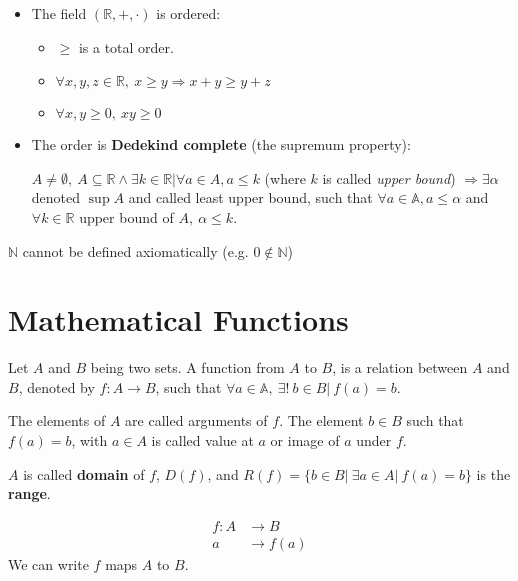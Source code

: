 \documentclass[12pt, a4paper]{book}
\begin{document}
\begin{defn}
\begin{itemize}
    \item The field $(\mathbb{R},+,\cdot)$ is ordered:
    \begin{itemize}
      \item $\geq$ is a total order.
      \item $\forall x,y,z\in\mathbb{R}, \ x\geq y \Rightarrow x+y \geq y+z$
      \item $\forall x,y \geq 0, \ xy\geq 0$
    \end{itemize}

    \item The order is \textbf{Dedekind complete} (the supremum property):
    
    $A \neq \emptyset, \ A \subseteq \mathbb{R} \wedge \exists k\in\mathbb{R} \vert \forall a\in A, a\leq k$ (where $k$ is called \textit{upper bound}) $\Rightarrow \exists \alpha$ denoted $\sup A$ and called least upper bound, such that $\forall a\in\mathbb{A}, a\leq\alpha$ and $\forall k\in\mathbb{R}$ upper bound of $A,\ \alpha \leq k$.
  \end{itemize}
\end{defn}

\begin{rem}
  $\mathbb{N}$ cannot be defined axiomatically (e.g. $0\notin\mathbb{N}$)
\end{rem}


\section{Mathematical Functions}

\begin{defn}
  Let $A$ and $B$ being two sets. A function from $A$ to $B$, is a relation between $A$ and $B$, denoted by $f:A\rightarrow B$, such that $\forall a\in\mathbb{A}, \ \exists!\ b\in B \vert \ f(a) = b$.

  The elements of $A$ are called arguments of $f$. The element $b\in B$ such that $f(a) = b$, with $a \in A$ is called value at $a$ or image of $a$ under $f$.

  $A$ is called \textbf{domain} of $f$, $D(f)$, and $R(f) = \{b\in B\vert\ \exists a\in A \vert\ f(a)=b\}$ is the \textbf{range}.
\end{defn}

\begin{notation}
  \begin{align*}
    f:A &\longrightarrow B \\
    a &\longrightarrow f(a)
  \end{align*}
  We can write $f$ maps $A$ to $B$.
\end{notation}
\end{document}
